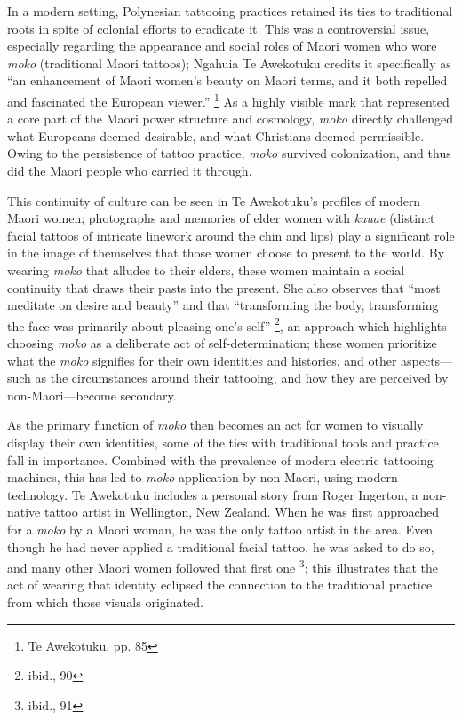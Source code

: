 In a modern setting, Polynesian tattooing practices retained its ties to
traditional roots in spite of colonial efforts to eradicate it. This was
a controversial issue, especially regarding the appearance and social roles of
Maori women who wore \textit{moko} (traditional Maori tattoos); Ngahuia Te
Awekotuku credits it specifically as ``an enhancement of Maori women's beauty on
Maori terms, and it both repelled and fascinated the European viewer.''
\footnote{Te Awekotuku, pp. 85} As a highly visible mark that represented a core
part of the Maori power structure and cosmology, \textit{moko} directly
challenged what Europeans deemed desirable, and what Christians deemed
permissible. Owing to the persistence of tattoo practice, \textit{moko} survived
colonization, and thus did the Maori people who carried it through.

This continuity of culture can be seen in Te Awekotuku's profiles of modern
Maori women; photographs and memories of elder women with \textit{kauae}
(distinct facial tattoos of intricate linework around the chin and lips) play a
significant role in the image of themselves that those women choose to present
to the world. By wearing \textit{moko} that alludes to their elders, these women
maintain a social continuity that draws their pasts into the present. She also
observes that ``most meditate on desire and beauty'' and that ``transforming the
body, transforming the face was primarily about pleasing one's self''
\footnote{ibid., 90}, an approach which highlights choosing
\textit{moko} as a deliberate act of self-determination; these women prioritize
what the \textit{moko} signifies for their own identities and histories, and
other aspects---such as the circumstances around their tattooing, and how they
are perceived by non-Maori---become secondary.

As the primary function of \textit{moko} then  becomes an act for women to visually
display their own identities, some of the ties with traditional tools and
practice fall in importance. Combined with the prevalence of modern
electric tattooing machines, this has led to \textit{moko} application by
non-Maori, using modern technology. Te Awekotuku includes a personal story from
Roger Ingerton, a non-native tattoo artist in Wellington, New Zealand. When he was
first approached for a \textit{moko} by a Maori woman, he was the only tattoo
artist in the area. Even though he had never applied a traditional facial
tattoo, he was asked to do so, and many other Maori women followed that first
one \footnote{ibid., 91}; this illustrates that the act of wearing that
identity eclipsed the connection to the traditional practice from which those
visuals originated.

